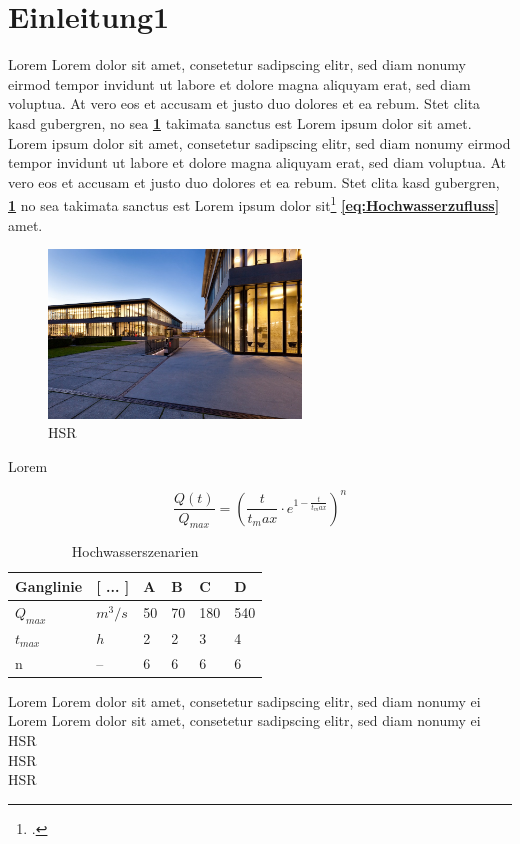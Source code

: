 \section{Einleitung1}


Lorem Lorem dolor sit amet, consetetur sadipscing elitr, sed diam nonumy eirmod tempor invidunt ut labore et dolore magna aliquyam erat, sed diam voluptua. At vero eos et accusam et justo duo dolores et \autocite[22]{Roppel2006} ea rebum. Stet clita kasd gubergren, no sea \textbf{\ref{tab:Hochwasserszenarien}} takimata sanctus est Lorem ipsum dolor sit amet. Lorem ipsum dolor sit amet, consetetur sadipscing elitr, sed diam nonumy eirmod tempor invidunt ut labore et dolore magna aliquyam erat, sed diam voluptua. At vero eos et accusam et justo duo dolores et ea rebum. Stet clita kasd gubergren, \textbf{\ref{fig:HSR}} no sea takimata sanctus est Lorem ipsum dolor sit\footcite{Roppel2006} \textbf{\ref{eq:Hochwasserzufluss}} amet.

\begin{figure}[ht]
	\centering
	\includegraphics[width=0.6\textwidth]{images/hsr.jpg}
	\caption{\acs{HSR} \autocite{IR}}
	\label{fig:HSR}
\end{figure}

Lorem

 \begin{equation}\label{eq:Hochwasserzufluss}
\frac{Q(t)}{Q_{max}} = \left(\frac{t}{t_max}\cdot e^{1-\frac{t}{t_max}} \right)^n
\end{equation}

\begin{table}[ht]
    \centering
	\begin{tabular}{|l|l|l|l|l|l|}
		\hline 
		\textbf{Ganglinie}	&\textbf{[ ... ]}  	& \textbf{A} 	 & \textbf{B}  	& \textbf{C} 	& \textbf{D}  \\ 
		\hline 
		$ Q_{max} $			& $ m^3/s $ 		& 50 			& 70		  	& 180			& 540 \\ 
		\hline 
		$ t_{max} $			& $ h $ 			& 2  			& 2 			& 3 			& 4 \\ 
		\hline 
		n					& --  				& 6  			& 6 			& 6 			& 6  \\ 
		\hline 
	\end{tabular} 
	\caption{Hochwasserszenarien}\label{tab:Hochwasserszenarien}
\end{table}

Lorem  Lorem dolor sit amet, consetetur sadipscing elitr, sed diam nonumy ei\\

Lorem  Lorem dolor sit amet, consetetur sadipscing elitr, sed diam nonumy ei \\
\ac{HSR}\\
\acs{HSR}\\
\acl{HSR}


\clearpage
